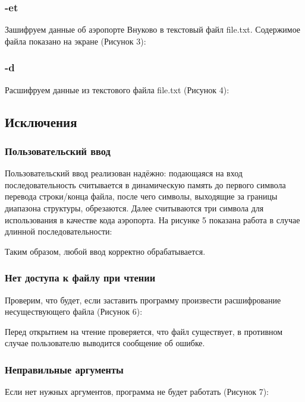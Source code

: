 \subsubsection{-et}
Зашифруем данные об аэропорте Внуково в текстовый файл file.txt. Содержимое файла показано на экране (Рисунок 3):

\FloatBarrier

\subsubsection{-d}
Расшифруем данные из текстового файла file.txt (Рисунок 4):

\FloatBarrier



\subsection{Исключения}

\subsubsection{Пользовательский ввод}
Пользовательский ввод реализован надёжно: подающаяся на вход последовательность считывается в динамическую память до первого символа перевода строки/конца файла, после чего символы, выходящие за границы диапазона структуры, обрезаются. Далее считываются три символа для использования в качестве кода аэропорта. На рисунке 5 показана работа в случае длинной последовательности:

\FloatBarrier

Таким образом, любой ввод корректно обрабатывается.


\subsubsection{Нет доступа к файлу при чтении}
Проверим, что будет, если заставить программу произвести расшифрование несуществующего файла (Рисунок 6):

\FloatBarrier

Перед открытием на чтение проверяется, что файл существует, в противном случае пользователю выводится сообщение об ошибке.

\subsubsection{Неправильные аргументы}
Если нет нужных аргументов, программа не будет работать (Рисунок 7):

